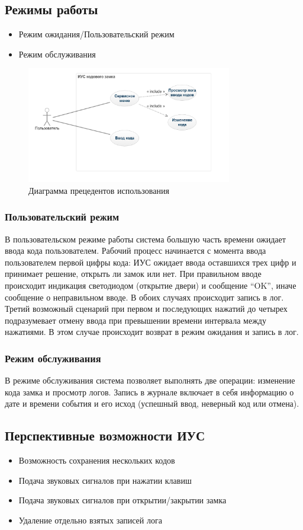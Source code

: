 \documentclass[12pt, a4paper] {article}
\begin{document}
\subsection{Режимы работы}
\begin{itemize}
  \item Режим ожидания/Пользовательский режим
  \item Режим обслуживания
\end{itemize}
\begin{figure}[h!]
  \centering
  \includegraphics[width=0.8\textwidth]{usecase}
  \caption{Диаграмма прецедентов использования}
\end{figure}
\subsubsection*{Пользовательский режим}
В пользовательском режиме работы система большую часть
времени ожидает ввода кода пользователем. Рабочий процесс
начинается с момента ввода пользователем первой цифры кода:
ИУС ожидает ввода оставшихся трех цифр и принимает решение,
открыть ли замок или нет. При правильном вводе происходит
индикация светодиодом (открытие двери) и сообщение ``OK'', иначе сообщение о
неправильном вводе. В обоих
случаях происходит запись в лог. Третий возможный сценарий
при первом и последующих нажатий до четырех подразумевает
отмену ввода при превышении времени интервала между нажатиями.
В этом случае происходит возврат в
режим ожидания и запись в лог.
\subsubsection*{Режим обслуживания}
В режиме обслуживания система позволяет выполнять две операции:
изменение кода замка и просмотр логов. Запись в журнале
включает в себя информацию о дате и времени события и его исход
(успешный ввод, неверный код или отмена).

\subsection{Перспективные возможности ИУС}
\begin{itemize}
  \item Возможность сохранения нескольких кодов
  \item Подача звуковых сигналов при нажатии клавиш
  \item Подача звуковых сигналов при открытии/закрытии замка
  \item Удаление отдельно взятых записей лога
\end{itemize}
\end{document}
